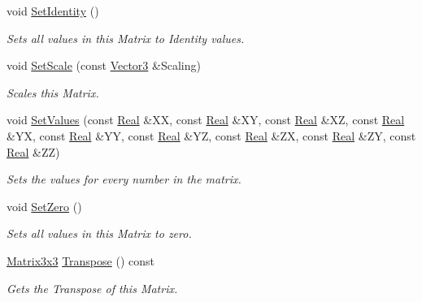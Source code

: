 \begin{DoxyCompactItemize}
void \hyperlink{classMezzanine_1_1Matrix3x3_af754b419dfc1d3490b0ee87a3fc3e99d}{SetIdentity} ()
\begin{DoxyCompactList}\small\item\em Sets all values in this Matrix to Identity values. \item\end{DoxyCompactList}\item 
void \hyperlink{classMezzanine_1_1Matrix3x3_a8a18cf942887c72c1d2b808e60d4fcf5}{SetScale} (const \hyperlink{classMezzanine_1_1Vector3}{Vector3} \&Scaling)
\begin{DoxyCompactList}\small\item\em Scales this Matrix. \item\end{DoxyCompactList}\item 
\hypertarget{classMezzanine_1_1Matrix3x3_a64e287eb019fb7b7961d809a98ed8908}{
void \hyperlink{classMezzanine_1_1Matrix3x3_a64e287eb019fb7b7961d809a98ed8908}{SetValues} (const \hyperlink{namespaceMezzanine_a726731b1a7df72bf3583e4a97282c6f6}{Real} \&XX, const \hyperlink{namespaceMezzanine_a726731b1a7df72bf3583e4a97282c6f6}{Real} \&XY, const \hyperlink{namespaceMezzanine_a726731b1a7df72bf3583e4a97282c6f6}{Real} \&XZ, const \hyperlink{namespaceMezzanine_a726731b1a7df72bf3583e4a97282c6f6}{Real} \&YX, const \hyperlink{namespaceMezzanine_a726731b1a7df72bf3583e4a97282c6f6}{Real} \&YY, const \hyperlink{namespaceMezzanine_a726731b1a7df72bf3583e4a97282c6f6}{Real} \&YZ, const \hyperlink{namespaceMezzanine_a726731b1a7df72bf3583e4a97282c6f6}{Real} \&ZX, const \hyperlink{namespaceMezzanine_a726731b1a7df72bf3583e4a97282c6f6}{Real} \&ZY, const \hyperlink{namespaceMezzanine_a726731b1a7df72bf3583e4a97282c6f6}{Real} \&ZZ)}
\label{classMezzanine_1_1Matrix3x3_a64e287eb019fb7b7961d809a98ed8908}

\begin{DoxyCompactList}\small\item\em Sets the values for every number in the matrix. \item\end{DoxyCompactList}\item 
\hypertarget{classMezzanine_1_1Matrix3x3_aedb141e072c34a539b9e9e506433a313}{
void \hyperlink{classMezzanine_1_1Matrix3x3_aedb141e072c34a539b9e9e506433a313}{SetZero} ()}
\label{classMezzanine_1_1Matrix3x3_aedb141e072c34a539b9e9e506433a313}

\begin{DoxyCompactList}\small\item\em Sets all values in this Matrix to zero. \item\end{DoxyCompactList}\item 
\hyperlink{classMezzanine_1_1Matrix3x3}{Matrix3x3} \hyperlink{classMezzanine_1_1Matrix3x3_ac759aa60d4dc6dee040b6741b6d44392}{Transpose} () const 
\begin{DoxyCompactList}\small\item\em Gets the Transpose of this Matrix. \item\end{DoxyCompactList}\end{DoxyCompactItemize}
